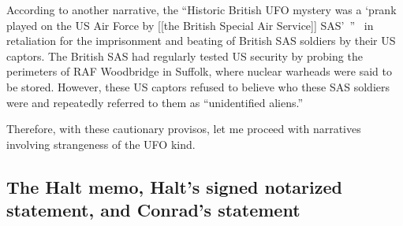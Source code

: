 According to another narrative, the ``Historic {B}ritish {UFO} mystery was a `prank played on the {US} Air Force by
[[the British Special Air Service]] {SAS}'~''~\cite{telegraph-2018-12-30}
in retaliation for the imprisonment and beating of British SAS soldiers by their US captors.
The British SAS had regularly tested US security by probing the perimeters of RAF Woodbridge in Suffolk, where nuclear warheads were said to be stored.
However, these US captors refused to believe who these
SAS soldiers were and repeatedly referred to them as ``unidentified aliens.''


Therefore, with these cautionary provisos, let me proceed with narratives involving strangeness of the UFO kind.


\subsection{The Halt memo, Halt's signed notarized statement, and Conrad's statement}

